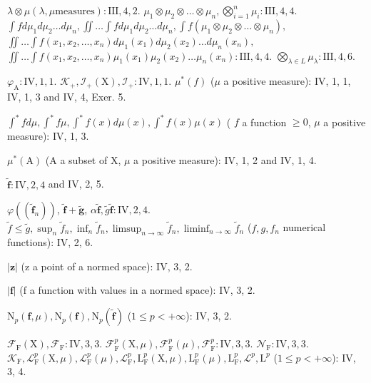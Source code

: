 \(\lambda \otimes \mu (\lambda ,\mu \text{measures}):\mathrm{III},4,2.\) \(\mu_1\otimes \mu_2\otimes \dots \otimes \mu_n,\bigotimes_{i = 1}^n\mu_i:\mathrm{III},4,4.\) \(\int f d\mu_1d\mu_2\dots d\mu_n,\iint \dots \int f d\mu_1d\mu_2\dots d\mu_n,\int f(\mu_1\otimes \mu_2\otimes \dots \otimes \mu_n),\) \(\iint \dots \int f(x_1,x_2,\ldots ,x_n)d\mu_1(x_1)d\mu_2(x_2)\dots d\mu_n(x_n),\) \(\iint \dots \int f(x_1,x_2,\ldots ,x_n)\mu_1(x_1)\mu_2(x_2)\dots \mu_n(x_n):\mathrm{III},4,4.\) \(\bigotimes_{\lambda \in L}\mu_{\lambda}:\mathrm{III},4,6.\)

\(\varphi_{\mathrm{A}}:\mathrm{IV},1,1.\) \(\mathcal{K}_{+},\mathcal{I}_{+}(\mathrm{X}),\mathcal{I}_{+}:\mathrm{IV},1,1.\) \(\mu^{*}(f)\) (\(\mu\) a positive measure): IV, 1, 1, IV, 1, 3 and IV, 4, Exer. 5.

\(\int^{*}fd\mu,\int^{*}f\mu,\int^{*}f(x)d\mu(x),\int^{*}f(x)\mu(x)\) ( \(f\) a function \(\geqslant 0\), \(\mu\) a positive measure): IV, 1, 3.

\(\mu^{*}(\mathrm{A})\) (A a subset of X, \(\mu\) a positive measure): IV, 1, 2 and IV, 1, 4.

\(\widetilde{\mathbf{f}}:\mathrm{IV},2,4\) and IV, 2, 5.

\(\varphi((\widetilde{\mathbf{f}}_n))\), \(\widetilde{\mathbf{f}} +\widetilde{\mathbf{g}}\), \(\alpha \widetilde{\mathbf{f}},\widetilde{g}\widetilde{\mathbf{f}}:\mathrm{IV},2,4.\) \(\widetilde{f}\leqslant \widetilde{g},\sup_{n}\widetilde{f}_n,\inf_n\widetilde{f}_n,\limsup_{n\to \infty}\widetilde{f}_n,\liminf_{n\to \infty}\widetilde{f}_n\) (\(f,g,f_n\) numerical functions): IV, 2, 6.

\(|\mathbf{z}|\) (z a point of a normed space): IV, 3, 2.

\(|\mathbf{f}|\) (f a function with values in a normed space): IV, 3, 2.

\(\mathrm{N}_p(\mathbf{f},\mu),\mathrm{N}_p(\mathbf{f}),\mathrm{N}_p(\widetilde{\mathbf{f}})\) (\(1\leqslant p<+\infty\)): IV, 3, 2.

\(\mathcal{F}_{\mathrm{F}}(\mathrm{X}),\mathcal{F}_{\mathrm{F}}:\mathrm{IV},3,3.\) \(\mathcal{F}_{\mathrm{F}}^{p}(\mathrm{X},\mu),\mathcal{F}_{\mathrm{F}}^{p}(\mu),\mathcal{F}_{\mathrm{F}}^{p}:\mathrm{IV},3,3.\) \(\mathcal{N}_{\mathrm{F}}:\mathrm{IV},3,3.\) \(\mathcal{K}_{\mathrm{F}},\mathcal{L}_{\mathrm{F}}^{p}(\mathrm{X},\mu),\mathcal{L}_{\mathrm{F}}^{p}(\mu),\mathcal{L}_{\mathrm{F}}^{p},\mathrm{L}_{\mathrm{F}}^{p}(\mathrm{X},\mu),\mathrm{L}_{\mathrm{F}}^{p}(\mu),\mathrm{L}_{\mathrm{F}}^{p},\mathcal{L}^{p},\mathrm{L}^{p}\) (\(1\leqslant p<+\infty\)): IV, 3, 4.

